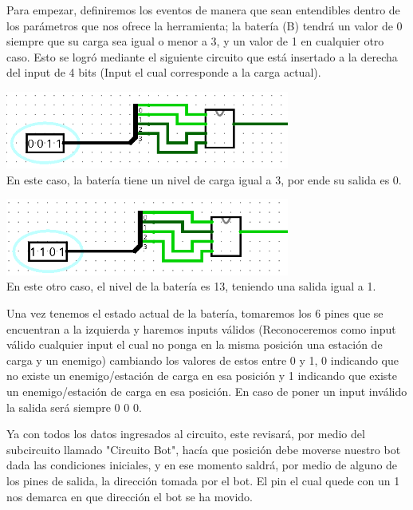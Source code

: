 \documentclass[a4paper]{article}
\begin{document}
Para empezar, definiremos los eventos de manera que sean entendibles dentro de los parámetros que nos ofrece la herramienta; la batería (B) tendrá un valor de 0 siempre que su carga sea igual o menor a 3, y un valor de 1 en cualquier otro caso. Esto se logró mediante el siguiente circuito que está insertado a la derecha del input de 4 bits (Input el cual corresponde a la carga actual). 


\begin{center}
    \includegraphics[width=0.7\textwidth]{tarea-1-carga-ej-1.png} %
    \\
    En este caso, la batería tiene un nivel de carga igual a 3, por ende su salida es 0.
\end{center}

\begin{center}
    \includegraphics[width=0.7\textwidth]{tarea-1-carga-ej-2.png} %
    \\
    En este otro caso, el nivel de la batería es 13, teniendo una salida igual a 1.
\end{center}

Una vez tenemos el estado actual de la batería, tomaremos los 6 pines que se encuentran a la izquierda y haremos inputs válidos (Reconoceremos como input válido cualquier input el cual no ponga en la misma posición una estación de carga y un enemigo) cambiando los valores de estos entre 0 y 1, 0 indicando que no existe un enemigo/estación de carga en esa posición y 1 indicando que existe un enemigo/estación de carga en esa posición. En caso de poner un input inválido la salida será siempre 0 0 0.


Ya con todos los datos ingresados al circuito, este revisará, por medio del subcircuito llamado "Circuito Bot", hacía que posición debe moverse nuestro bot dada las condiciones iniciales, y en ese momento saldrá, por medio de alguno de los pines de salida, la dirección tomada por el bot. El pin el cual quede con un 1 nos demarca en que dirección el bot se ha movido.
\end{document}
